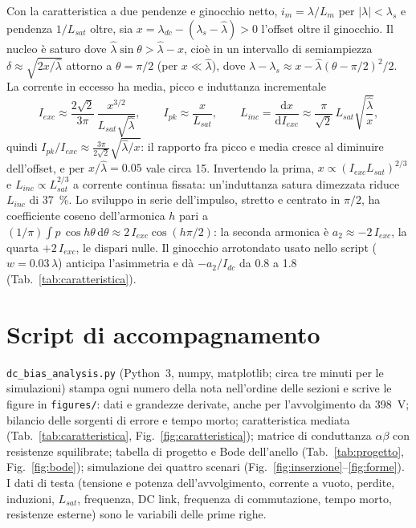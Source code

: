 \documentclass[10pt,a4paper]{scrartcl}
\newcommand{\dif}{\mathrm{d}}
\newcommand{\code}[1]{\texttt{#1}}
\newcommand{\Lm}{L_m}
\newcommand{\Lsat}{L_{sat}}
\newcommand{\Linc}{L_{inc}}
\newcommand{\lamhat}{\hat\lambda}
\newcommand{\lams}{\lambda_s}
\newcommand{\lamdc}{\lambda_{dc}}
\newcommand{\Idc}{I_{dc}}
\begin{document}
\begin{onehalfspace}
Con la caratteristica a due pendenze e ginocchio netto, $i_m = \lambda/\Lm$ per $|\lambda| < \lams$ e pendenza $1/\Lsat$ oltre, sia $x = \lamdc - (\lams - \lamhat) > 0$ l'offset oltre il ginocchio. Il nucleo è saturo dove $\lamhat\sin\theta > \lamhat - x$, cioè in un intervallo di semiampiezza $\delta \approx \sqrt{2x/\lamhat}$ attorno a $\theta = \pi/2$ (per $x \ll \lamhat$), dove $\lambda - \lams \approx x - \lamhat(\theta - \pi/2)^2/2$. La corrente in eccesso ha media, picco e induttanza incrementale
\begin{equation}
I_{exc} \approx \frac{2\sqrt2}{3\pi}\,\frac{x^{3/2}}{\Lsat\sqrt{\lamhat}}, \qquad
I_{pk} \approx \frac{x}{\Lsat}, \qquad
\Linc = \frac{\dif x}{\dif I_{exc}} \approx \frac{\pi}{\sqrt2}\,\Lsat\sqrt{\frac{\lamhat}{x}} ,
\label{eq:impulso}
\end{equation}
quindi $I_{pk}/I_{exc} \approx \frac{3\pi}{2\sqrt2}\sqrt{\lamhat/x}$: il rapporto fra picco e media cresce al diminuire dell'offset, e per $x/\lamhat = \num{0.05}$ vale circa 15. Invertendo la prima, $x \propto (I_{exc}\Lsat)^{2/3}$ e $\Linc \propto \Lsat^{2/3}$ a corrente continua fissata: un'induttanza satura dimezzata riduce $\Linc$ di \SI{37}{\percent}. Lo sviluppo in serie dell'impulso, stretto e centrato in $\pi/2$, ha coefficiente coseno dell'armonica $h$ pari a $(1/\pi)\int p\,\cos h\theta\,\dif\theta \approx 2\,I_{exc}\cos(h\pi/2)$: la seconda armonica è $a_2 \approx -2\,I_{exc}$, la quarta $+2\,I_{exc}$, le dispari nulle. Il ginocchio arrotondato usato nello script ($w = \num{0.03}\,\lamhat$) anticipa l'asimmetria e dà $-a_2/\Idc$ da \num{0.8} a \num{1.8} (Tab.~\ref{tab:caratteristica}).

\section{Script di accompagnamento}
\label{app:script}

\code{dc\_bias\_analysis.py} (Python~3, numpy, matplotlib; circa tre minuti per le simulazioni) stampa ogni numero della nota nell'ordine delle sezioni e scrive le figure in \code{figures/}: dati e grandezze derivate, anche per l'avvolgimento da \SI{398}{V}; bilancio delle sorgenti di errore e tempo morto; caratteristica mediata (Tab.~\ref{tab:caratteristica}, Fig.~\ref{fig:caratteristica}); matrice di conduttanza $\alpha\beta$ con resistenze squilibrate; tabella di progetto e Bode dell'anello (Tab.~\ref{tab:progetto}, Fig.~\ref{fig:bode}); simulazione dei quattro scenari (Fig.~\ref{fig:inserzione}--\ref{fig:forme}). I dati di testa (tensione e potenza dell'avvolgimento, corrente a vuoto, perdite, induzioni, $\Lsat$, frequenza, DC link, frequenza di commutazione, tempo morto, resistenze esterne) sono le variabili delle prime righe.

\end{onehalfspace}
\end{document}
